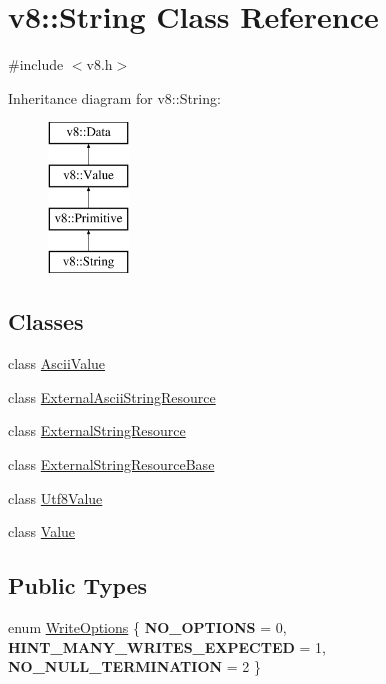 \hypertarget{classv8_1_1_string}{}\section{v8\+:\+:String Class Reference}
\label{classv8_1_1_string}


{\ttfamily \#include $<$v8.\+h$>$}

Inheritance diagram for v8\+:\+:String\+:\begin{figure}[H]
\begin{center}
\leavevmode
\includegraphics[height=4.000000cm]{classv8_1_1_string}
\end{center}
\end{figure}
\subsection*{Classes}
\begin{DoxyCompactItemize}
\item 
class \hyperlink{classv8_1_1_string_1_1_ascii_value}{Ascii\+Value}
\item 
class \hyperlink{classv8_1_1_string_1_1_external_ascii_string_resource}{External\+Ascii\+String\+Resource}
\item 
class \hyperlink{classv8_1_1_string_1_1_external_string_resource}{External\+String\+Resource}
\item 
class \hyperlink{classv8_1_1_string_1_1_external_string_resource_base}{External\+String\+Resource\+Base}
\item 
class \hyperlink{classv8_1_1_string_1_1_utf8_value}{Utf8\+Value}
\item 
class \hyperlink{classv8_1_1_string_1_1_value}{Value}
\end{DoxyCompactItemize}
\subsection*{Public Types}
\begin{DoxyCompactItemize}
\item 
enum \hyperlink{classv8_1_1_string_a9ce7f1458ffd08f8eb2b9c8dc056e616}{Write\+Options} \{ {\bfseries N\+O\+\_\+\+O\+P\+T\+I\+O\+N\+S} = 0, 
{\bfseries H\+I\+N\+T\+\_\+\+M\+A\+N\+Y\+\_\+\+W\+R\+I\+T\+E\+S\+\_\+\+E\+X\+P\+E\+C\+T\+E\+D} = 1, 
{\bfseries N\+O\+\_\+\+N\+U\+L\+L\+\_\+\+T\+E\+R\+M\+I\+N\+A\+T\+I\+O\+N} = 2
 \}
\end{DoxyCompactItemize}
